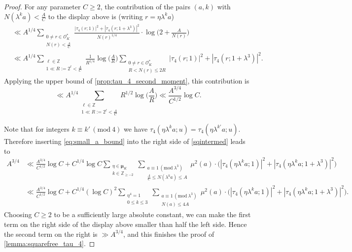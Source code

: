 \documentclass[12pt,reqno]{amsart}
\numberwithin{equation}{section}
\renewcommand{\pmod}[1]{\, (\mathrm{mod}\ #1)}
\newcommand{\Z}{\mathbb{Z}}
\begin{document}
\begin{proof}
    For any parameter $C \geq 2$, the contribution of the pairs $(a, k)$ with $N(\lambda^k a) < \frac{A}{C}$ to the display above is (writing $r = \eta \lambda^k a$)
    \begin{align*}
        &\ll A^{1/4} \sum_{\substack{0 \neq r \in \mathcal{O}^*_K \\ N(r) < \frac{A}{C}}} \frac{|\tau_4(r; 1)|^2 + |\tau_4(r; 1+\lambda^3)|^2}{N(r)^{1/4}} \cdot \log\Big(2 + \frac{A}{N(r)}\Big) \\
        &\ll A^{1/4} \sum_{\substack{\ell \in \Z \\ 1 \ll R := 2^\ell < \frac{A}{C}}} \frac{1}{R^{1/4}} \log{\Big(\frac{A}{R}\Big)} \sum_{\substack{0 \neq r \in \mathcal{O}^*_K \\ R < N(r) \leq 2R}} |\tau_4(r;1)|^2 + |\tau_4(r;1+\lambda^3)|^2.
    \end{align*}
    Applying the upper bound of \cref{prop:tau_4_second_moment}, this contribution is 
    \begin{equation}\label{eq:small_a_bound}
        \ll A^{1/4} \sum_{\substack{\ell \in \Z \\ 1 \ll R := 2^\ell < \frac{A}{C}}} R^{1/2} \log{\Big(\frac{A}{R}\Big)} \ll \frac{A^{3/4}}{C^{1/2}} \log{C}.
    \end{equation}
 
   Note that for integers $k \equiv k' \pmod{4}$ we have $\tau_4(\eta \lambda^k a; u) = \tau_4(\eta \lambda^{k'} a; u)$. Therefore inserting \eqref{eq:small_a_bound} into the right side of 
    \eqref{sqintermed} leads to
    \begin{align*}
        A^{3/4} &\ll \frac{A^{3/4}}{C^{1/2}} \log{C} + C^{1/4} \log{C} \sum_{\substack{\eta \in \boldsymbol{\mu}_K \\ k \in \Z_{\geq -2}}} \sum_{\substack{a \equiv 1 \pmod{\lambda^3} \\ \frac{A}{C} \leq N(\lambda^k a) \leq A}} \mu^2(a) \cdot \big(|\tau_4(\eta \lambda^k a; 1)|^2 + |\tau_4(\eta \lambda^k a; 1+\lambda^3)|^2\big)  \\
        & \ll \frac{A^{3/4}}{C^{1/2}} \log{C} + C^{1/4} (\log{C})^2 \sum_{\substack{\eta^4 =1 \\ 0 \leq k \leq 3}} \sum_{\substack{a \equiv 1 \pmod{\lambda^3} \\ N(a) \leq 4A}} \mu^2(a) \cdot \big(|\tau_4(\eta \lambda^k a; 1)|^2 + |\tau_4(\eta \lambda^k a; 1+\lambda^3)|^2\big) .
    \end{align*}
    Choosing $C\geq 2$ to be a sufficiently large absolute constant, we can make the first term on the right side of the display above smaller than half the left side. Hence the second term on the right is $\gg A^{3/4}$, and this finishes the proof of \cref{lemma:squarefree_tau_4}.
\end{proof}
\end{document}
